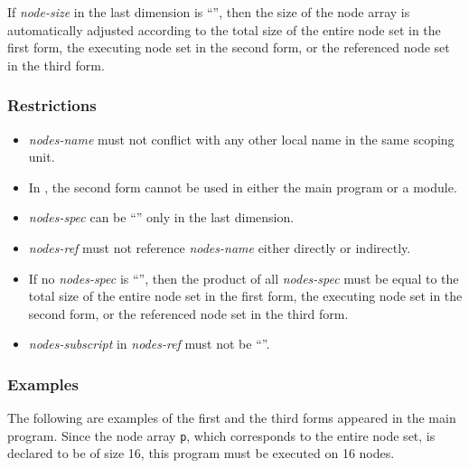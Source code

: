 If {\it node-size} in the last dimension is ``{\tt *}'', then the size
of the node array is automatically adjusted according to the total size
of the entire node set in the first form, the executing node set in the
second form, or the referenced node set in the third form.

\subsubsection*{Restrictions}

\begin{itemize}
\item {\it nodes-name} must not conflict with any other local name in
      the same scoping unit.
\item In {\Fort}, the second form cannot be used in either the main
      program or a module.
\item {\it nodes-spec} can be ``{\tt *}'' only in the last dimension.
\item {\it nodes-ref} must not reference {\it nodes-name} either
      directly or indirectly.
\item If no {\it nodes-spec} is ``{\tt *}'', then the product
      of all {\it nodes-spec} must be equal to the total size of the
      entire node set in the first form, the executing node set in the
      second form, or the referenced node set in the third form.
%
\item {\it nodes-subscript} in {\it nodes-ref} must not be ``{\tt *}''.
\end{itemize}

\subsubsection*{Examples}

The following are examples of the first and the third forms appeared in
the main program. Since the node array {\tt p}, which corresponds to the
entire node set, is declared to be of size 16, this program must be
executed on 16 nodes.


